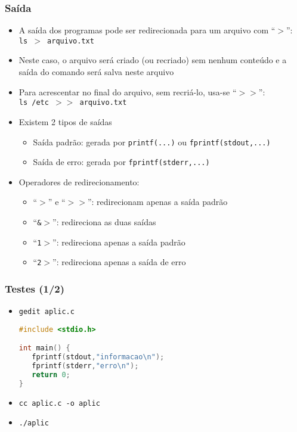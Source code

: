 \documentclass[aspectratio=169]{beamer}
\begin{document}
\begin{frame}\frametitle{Saída}
\begin{itemize}
	\item A saída dos programas pode ser redirecionada para um arquivo com ``\texttt{$>$}'':\\
\texttt{ls $>$ arquivo.txt}
	\item Neste caso, o arquivo será criado (ou recriado) sem nenhum conteúdo e a saída do comando será salva neste arquivo
	\item Para acrescentar no final do arquivo, sem recriá-lo, usa-se ``\texttt{$>>$}'':\\
\texttt{ls /etc $>>$ arquivo.txt}
	\item Existem 2 tipos de saídas
	\begin{itemize}
		\item Saída padrão: gerada por \texttt{printf(...)} ou \texttt{fprintf(stdout,...)}
		\item Saída de erro: gerada por \texttt{fprintf(stderr,...)}
	\end{itemize}
	\item Operadores de redirecionamento:
	\begin{itemize}
		\item ``\texttt{$>$}'' e ``\texttt{$>>$}'': redirecionam apenas a saída padrão
		\item ``\texttt{\&$>$}'': redireciona as duas saídas
		\item ``\texttt{1$>$}'': redireciona apenas a saída padrão
		\item ``\texttt{2$>$}'': redireciona apenas a saída de erro
	\end{itemize}
\end{itemize}
\end{frame}

\begin{frame}[fragile]\frametitle{Testes (1/2)}
\begin{itemize}
	\item \texttt{gedit aplic.c}
\begin{block}{}
\begin{lstlisting}[language=C,basicstyle=\ttfamily,keywordstyle=\color{red}]
#include <stdio.h>

int main() {
   fprintf(stdout,"informacao\n");
   fprintf(stderr,"erro\n");
   return 0;
}
\end{lstlisting}
\end{block}
	\item \texttt{cc aplic.c -o aplic}
	\item \texttt{./aplic}
\end{itemize}
\end{frame}
\end{document}
